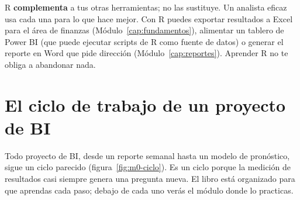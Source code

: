 \begin{consejo}
R \textbf{complementa} a tus otras herramientas; no las sustituye. Un
analista eficaz usa cada una para lo que hace mejor. Con R puedes exportar
resultados a Excel para el área de finanzas (Módulo~\ref{cap:fundamentos}),
alimentar un tablero de Power BI (que puede ejecutar scripts de R como
fuente de datos) o generar el reporte en Word que pide dirección
(Módulo~\ref{cap:reportes}). Aprender R no te obliga a abandonar nada.
\end{consejo}

\section{El ciclo de trabajo de un proyecto de BI}
\label{sec:m0-ciclo}

Todo proyecto de BI, desde un reporte semanal hasta un modelo de
pronóstico, sigue un ciclo parecido (figura~\ref{fig:m0-ciclo}). Es un
ciclo porque la medición de resultados casi siempre genera una pregunta
nueva. El libro está organizado para que aprendas cada paso; debajo de cada
uno verás el módulo donde lo practicas.

